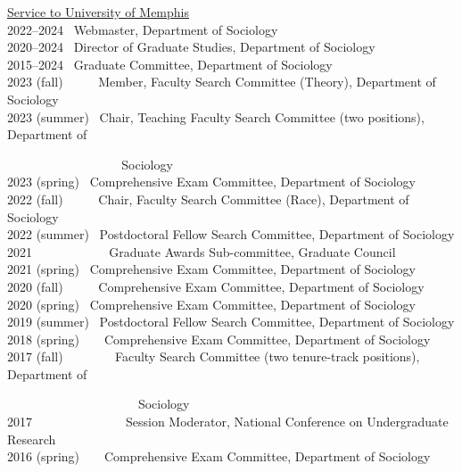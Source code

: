 \documentclass[11pt,]{article}
\begin{document}
\underline{Service to University of Memphis}\\
2022--2024 ~Webmaster, Department of Sociology\\
2020--2024 ~Director of Graduate Studies, Department of Sociology\\
2015--2024 ~Graduate Committee, Department of Sociology\\
2023 (fall) ~ ~ ~ Member, Faculty Search Committee (Theory), Department
of Sociology\\
2023 (summer) ~Chair, Teaching Faculty Search Committee (two positions),
Department of\\
\strut ~ ~ ~ ~ ~ ~ ~ ~ ~ ~ ~ Sociology\\
2023 (spring) ~Comprehensive Exam Committee, Department of Sociology\\
2022 (fall) ~ ~ ~ Chair, Faculty Search Committee (Race), Department of
Sociology\\
2022 (summer) ~Postdoctoral Fellow Search Committee, Department of
Sociology\\
2021 ~ ~ ~ ~ ~ ~ ~ Graduate Awards Sub-committee, Graduate Council\\
2021 (spring) ~Comprehensive Exam Committee, Department of Sociology\\
2020 (fall) ~ ~ ~ Comprehensive Exam Committee, Department of
Sociology\\
2020 (spring) ~Comprehensive Exam Committee, Department of Sociology\\
2019 (summer) ~Postdoctoral Fellow Search Committee, Department of
Sociology\\
2018 (spring) ~ ~ Comprehensive Exam Committee, Department of
Sociology\\
2017 (fall) ~ ~ ~ ~ ~Faculty Search Committee (two tenure-track
positions), Department of\\
\strut ~ ~ ~ ~ ~ ~ ~ ~ ~ ~ ~ ~ ~Sociology\\
2017 ~ ~ ~ ~ ~ ~ ~ ~ ~Session Moderator, National Conference on
Undergraduate Research\\
2016 (spring) ~ ~ Comprehensive Exam Committee, Department of Sociology
\end{document}
